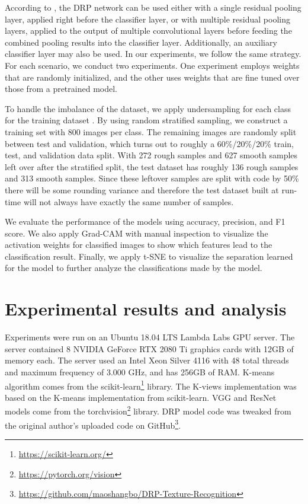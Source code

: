 \documentclass{aci}
\numberwithin{equation}{section}
\begin{document}
According to \cite{mao_deep_2021}, the DRP network can be used either with a
single residual pooling layer, applied right before the classifier layer, or
with multiple residual pooling layers, applied to the output of multiple
convolutional layers before feeding the combined pooling results into the
classifier layer. Additionally, an auxiliary classifier layer may also be used.
In our experiments, we follow the same strategy. For each scenario, we conduct
two experiments. One experiment employs weights that are randomly initialized,
and the other uses weights that are fine tuned over those from a pretrained
model.

To handle the imbalance of the dataset, we apply undersampling for each class
for the training dataset \cite{tiittanen_novel_2022}. By using random stratified
sampling, we construct a training set with 800 images per class. The remaining
images are randomly split between test and validation, which turns out to
roughly a 60\%/20\%/20\% train, test, and validation data split. With 272 rough
samples and 627 smooth samples left over after the stratified split, the test
dataset has roughly 136 rough samples and 313 smooth samples. Since these
leftover samples are split with code by 50\% there will be some rounding
variance and therefore the test dataset built at run-time will not always have
exactly the same number of samples.


We evaluate the performance of the models using accuracy, precision, and F1
score. We also apply Grad-CAM with manual inspection to visualize the activation
weights for classified images to show which features lead to the
classification result. Finally, we apply t-SNE to visualize the separation
learned for the model to further analyze the classifications made by the model.

\section{Experimental results and analysis}


Experiments were run on an Ubuntu 18.04 LTS Lambda Labs GPU server. The server
contained 8 NVIDIA GeForce RTX 2080 Ti graphics cards with 12GB of memory each.
The server used an Intel Xeon Silver 4116 with 48 total threads and maximum
frequency of 3.000 GHz, and has 256GB of RAM. K-means algorithm comes from the
scikit-learn\footnote{\url{https://scikit-learn.org/}} library. The K-views
implementation was based on the K-means implementation from scikit-learn. VGG
and ResNet models come from the
torchvision\footnote{\url{https://pytorch.org/vision}} library. DRP model code
was tweaked from the original author's uploaded code on
GitHub\footnote{\url{https://github.com/maoshangbo/DRP-Texture-Recognition}}.
\end{document}
